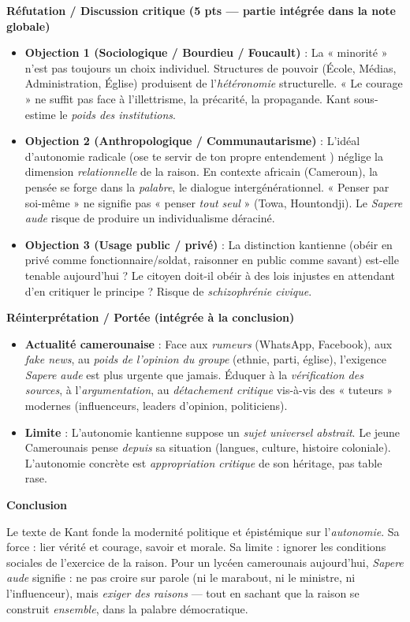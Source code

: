 \documentclass[11pt]{article}
\begin{document}
\begin{corrige}
\textbf{Réfutation / Discussion critique (5 pts — partie intégrée dans la note globale)}\par
\begin{itemize}
\item \textbf{Objection 1 (Sociologique / Bourdieu / Foucault)} : La « minorité » n'est pas toujours un choix individuel. Structures de pouvoir (École, Médias, Administration, Église) produisent de l'\emph{hétéronomie} structurelle. « Le courage » ne suffit pas face à l'illettrisme, la précarité, la propagande. Kant sous-estime le \emph{poids des institutions}.
\item \textbf{Objection 2 (Anthropologique / Communautarisme)} : L'idéal d'autonomie radicale (\guillemotleft ose te servir de ton propre entendement \guillemotright) néglige la dimension \emph{relationnelle} de la raison. En contexte africain (Cameroun), la pensée se forge dans la \emph{palabre}, le dialogue intergénérationnel. « Penser par soi-même » ne signifie pas « penser \emph{tout seul} » (Towa, Hountondji). Le \emph{Sapere aude} risque de produire un individualisme déraciné.
\item \textbf{Objection 3 (Usage public / privé)} : La distinction kantienne (obéir en privé comme fonctionnaire/soldat, raisonner en public comme savant) est-elle tenable aujourd'hui ? Le citoyen doit-il obéir à des lois injustes en attendant d'en critiquer le principe ? Risque de \emph{schizophrénie civique}.
\end{itemize}

\textbf{Réinterprétation / Portée (intégrée à la conclusion)}\par
\begin{itemize}
\item \textbf{Actualité camerounaise} : Face aux \emph{rumeurs} (WhatsApp, Facebook), aux \emph{fake news}, au \emph{poids de l'opinion du groupe} (ethnie, parti, église), l'exigence \emph{Sapere aude} est plus urgente que jamais. Éduquer à la \emph{vérification des sources}, à l'\emph{argumentation}, au \emph{détachement critique} vis-à-vis des « tuteurs » modernes (influenceurs, leaders d'opinion, politiciens).
\item \textbf{Limite} : L'autonomie kantienne suppose un \emph{sujet universel abstrait}. Le jeune Camerounais pense \emph{depuis} sa situation (langues, culture, histoire coloniale). L'autonomie concrète est \emph{appropriation critique} de son héritage, pas table rase.
\end{itemize}

\textbf{Conclusion}\par
Le texte de Kant fonde la modernité politique et épistémique sur l'\emph{autonomie}. Sa force : lier vérité et courage, savoir et morale. Sa limite : ignorer les conditions sociales de l'exercice de la raison. Pour un lycéen camerounais aujourd'hui, \emph{Sapere aude} signifie : ne pas croire sur parole (ni le marabout, ni le ministre, ni l'influenceur), mais \emph{exiger des raisons} — tout en sachant que la raison se construit \emph{ensemble}, dans la palabre démocratique.


\end{corrige}
\end{document}
